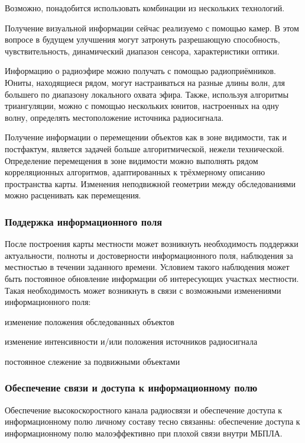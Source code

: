 Возможно, понадобится использовать комбинации из нескольких технологий.

Получение визуальной информации сейчас реализуемо с помощью камер. В этом
вопросе в будущем улучшения могут затронуть разрешающую способность, чувствительность,
динамический диапазон сенсора, характеристики оптики.

Информацию о радиоэфире можно получать с помощью радиоприёмников. Юниты, находящиеся
рядом, могут настраиваться на разные длины волн, для большего по диапазону
локального охвата эфира. Также, используя алгоритмы триангуляции, можно 
с помощью нескольких юнитов, настроенных на одну волну, определять местоположение
источника радиосигнала.

Получение информации о перемещении объектов как в зоне видимости,
так и постфактум, является задачей больше алгоритмической, нежели технической.
Определение перемещения в зоне видимости можно выполнять рядом корреляционных
алгоритмов, адаптированных к трёхмерному описанию пространства карты.
Изменения неподвижной геометрии между обследованиями можно расценивать как
перемещения.

\subsubsection{Поддержка информационного поля}

После построения карты местности может возникнуть необходимость
поддержки актуальности, полноты и достоверности информационного поля,
наблюдения за местностью в течении заданного времени.
Условием такого наблюдения может быть постоянное обновление информации
об интересующих участках местности. Такая необходимость может возникнуть
в связи с возможными изменениями информационного поля:
\begin{mintemize}
\item изменение положения обследованных объектов 
\item изменение интенсивности и/или положения источников радиосигнала
\item постоянное слежение за подвижными объектами
\end{mintemize}

\subsubsection{Обеспечение связи и доступа к информационному полю}

Обеспечение высокоскоростного канала радиосвязи и обеспечение
доступа к информационному полю личному составу тесно связанны:
обеспечение доступа к информационному полю малоэффективно при
плохой связи внутри МБПЛА.


